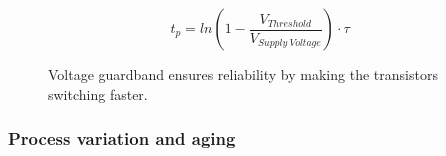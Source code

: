 \begin{equation}
    t_p=ln(1-\frac{V_{Threshold}}{V_{Supply \: Voltage}})\cdot\tau
    \label{eq:tp_v_scaling}
\end{equation}

\begin{figure}[!htb]
    \centering
  \begin{subfigmatrix}{2}
  \end{subfigmatrix}
  \caption{Voltage guardband ensures reliability by making the transistors switching faster.}
\end{figure}




\subsubsection{Process variation and aging}

